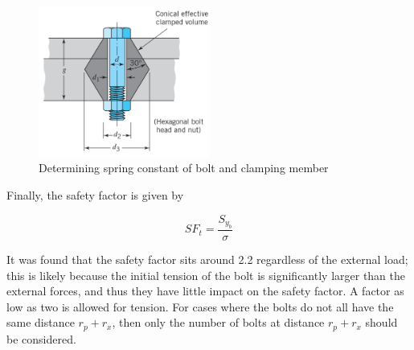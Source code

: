\begin{figure}
    \centering
    \includegraphics[width=0.5\textwidth]{4_Analysis/img/Bolts/BoltTensionDiagram.png}
    \caption{Determining spring constant of bolt and clamping member \cite{juvinall_fundamentals_2012}}
    \label{fig:bolts_spring_constant}
\end{figure}{}

Finally, the safety factor is given by

\begin{equation}
    {SF}_t = \frac{S_{y_b}}{\sigma}
\end{equation}{}

It was found that the safety factor sits around 2.2 regardless of the external load; this is likely because the initial tension of the bolt is significantly larger than the external forces, and thus they have little impact on the safety factor.
A factor as low as two is allowed for tension.
For cases where the bolts do not all have the same distance $r_p+r_x$, then only the number of bolts at distance $r_p+r_x$ should be considered.


